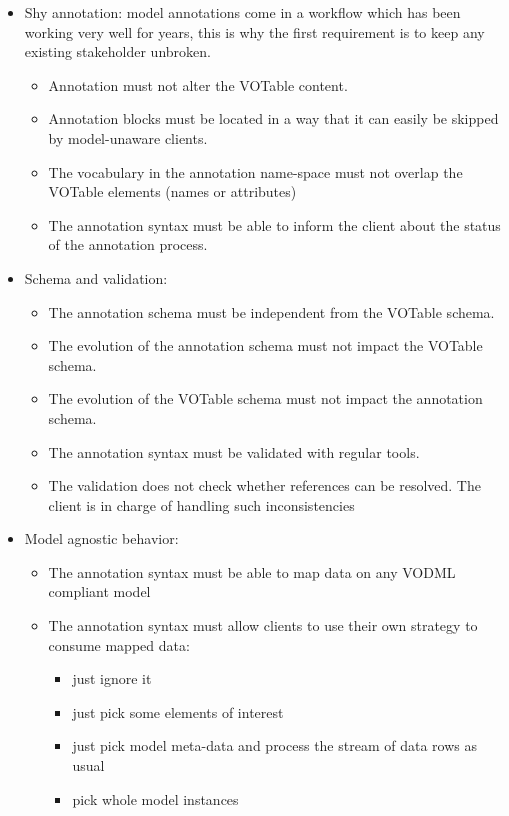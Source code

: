 \begin {itemize}
  \item Shy annotation: model annotations come in a workflow which has been working very well for years, this is why the first requirement is to keep any existing stakeholder unbroken.
  \begin {itemize}
    \item Annotation must not alter the VOTable content.
    \item Annotation blocks must be located in a way that it can easily be skipped by model-unaware clients.
    \item The vocabulary in the annotation name-space must not overlap the VOTable elements (names or attributes)    
    \item The annotation syntax must be able to inform the client about the status of the annotation process.
  \end {itemize}
  
  \item Schema and validation:
  \begin {itemize}
    \item The annotation schema must be independent from the VOTable schema.
    \item The evolution of the annotation schema must not impact the VOTable schema.
    \item The evolution of the VOTable schema must not impact the annotation schema.
    \item The annotation syntax must be validated with regular tools.
    \item The validation does not check whether references can be resolved. The client is in charge of handling such inconsistencies
  \end {itemize}
  
  \item Model agnostic behavior:
  \begin {itemize}
    \item The annotation syntax must be able to map data on any VODML compliant model
    \item The annotation syntax must allow clients to use their own strategy to consume mapped data:
      \begin {itemize}
        \item just ignore it
        \item just pick some elements of interest 
        \item just pick model meta-data and process the stream of data rows as usual
        \item pick whole model instances
      \end {itemize}
  \end {itemize}
  
\end {itemize}

